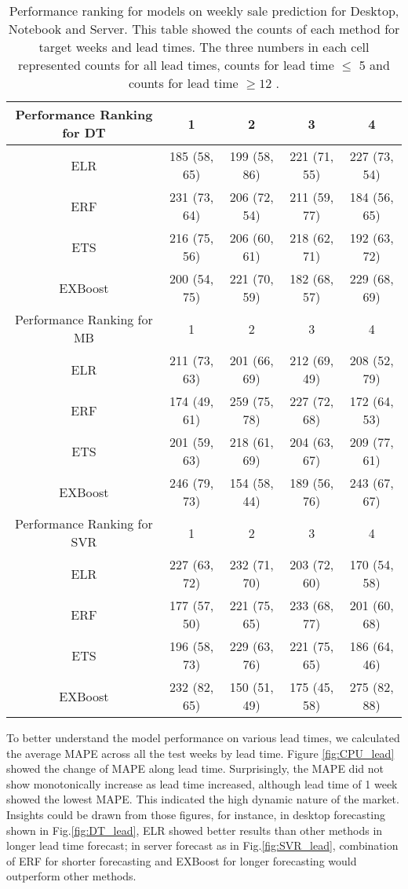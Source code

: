 \documentclass{llncs}
\begin{document}
\begin{table*}[ht]
\centering
 \begin{tabular}{|| c | c | c | c | c ||} 
 \hline
 Performance Ranking for DT & 1 & 2 & 3 & 4 \\ 
 \hline
 ELR & 185 (58, 65) & 199 (58, 86) & 221 (71, 55) & 227 (73, 54) \\ 
 \hline
 ERF & 231 (73, 64) & 206 (72, 54) & 211 (59, 77)& 184 (56, 65)\\
 \hline
 ETS & 216 (75, 56) & 206 (60, 61) & 218 (62, 71) & 192 (63, 72) \\
 \hline
 EXBoost & 200 (54, 75) & 221 (70, 59) & 182 (68, 57) & 229 (68, 69) \\ 
 \hline\hline
 
 Performance Ranking for MB & 1 & 2 & 3 & 4\\ 
 \hline
 ELR & 211 (73, 63) & 201 (66, 69) & 212 (69, 49)& 208 (52, 79) \\ 
 \hline
 ERF & 174 (49, 61) & 259 (75, 78) & 227 (72, 68)& 172 (64, 53)\\
 \hline
 ETS & 201 (59, 63) & 218 (61, 69) & 204 (63, 67) & 209 (77, 61) \\
 \hline
 EXBoost & 246 (79, 73) & 154 (58, 44) & 189 (56, 76) & 243 (67, 67) \\ 
 \hline\hline
 
 Performance Ranking for SVR & 1 & 2 & 3 & 4\\ 
 \hline
 ELR & 227 (63, 72) & 232 (71, 70) & 203 (72, 60)& 170 (54, 58) \\ 
 \hline
 ERF & 177 (57, 50) & 221 (75, 65) & 233 (68, 77)& 201 (60, 68)\\
 \hline
 ETS & 196 (58, 73) & 229 (63, 76) & 221 (75, 65) & 186 (64, 46) \\
 \hline
 EXBoost & 232 (82, 65) & 150 (51, 49) & 175 (45, 58) & 275 (82, 88) \\ 
 \hline
\end{tabular}
\caption{Performance ranking for models on weekly sale prediction for Desktop, Notebook and Server. This table showed the counts of each method for target weeks and lead times. The three numbers in each cell represented counts for all lead times, counts for lead time $\leq$ 5 and counts for lead time $\geq12$ .}
\label{tab:perf_DT}
\end{table*}



To better understand the model performance on various lead times, we calculated the average MAPE across all the test weeks by lead time. Figure \ref{fig:CPU_lead} showed the change of MAPE along lead time. Surprisingly, the MAPE did not show monotonically increase as lead time increased, although lead time of 1 week showed the lowest MAPE. This indicated the high dynamic nature of the market. Insights could be drawn from those figures, for instance, in desktop forecasting shown in Fig.\ref{fig:DT_lead}, ELR showed better results than other methods in longer lead time forecast; in server forecast as in Fig.\ref{fig:SVR_lead}, combination of ERF for shorter forecasting and EXBoost for longer forecasting would outperform other methods.
\end{document}
